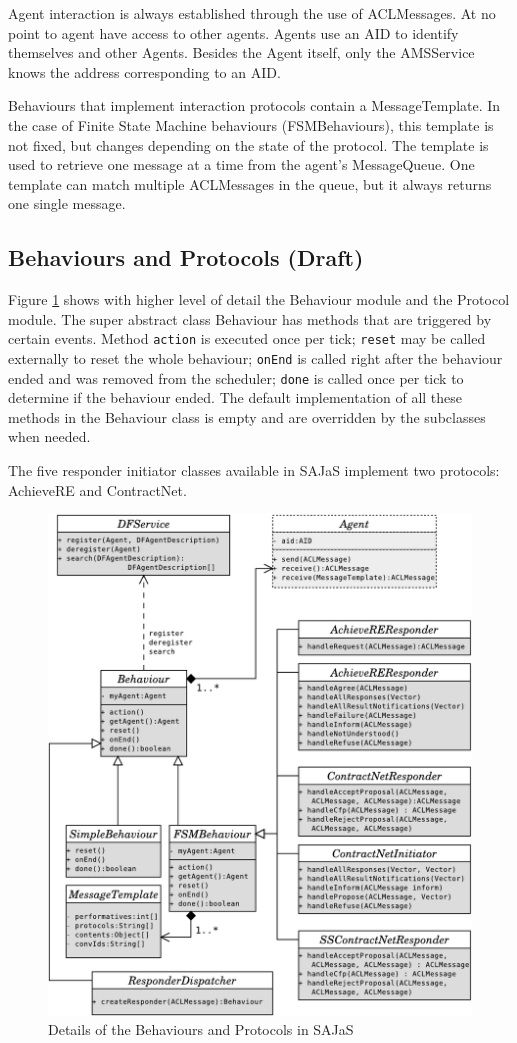 Agent interaction is always established through the use of ACLMessages. At no point to agent have access to other agents. Agents use an AID to identify themselves and other Agents. Besides the Agent itself, only the AMSService knows the address corresponding to an AID.

Behaviours that implement interaction protocols contain a MessageTemplate. In the case of Finite State Machine behaviours (FSMBehaviours), this template is not fixed, but changes depending on the state of the protocol. The template is used to retrieve one message at a time from the agent's MessageQueue. One template can match multiple ACLMessages in the queue, but it always returns one single message.

\subsection{Behaviours and Protocols (Draft)}
\label{sec:arch_behaviours}
Figure \ref{fig:arch_proto} shows with higher level of detail the Behaviour module and the Protocol module. The super abstract class Behaviour has methods that are triggered by certain events. Method \texttt{action} is executed once per tick; \texttt{reset} may be called externally to reset the whole behaviour; \texttt{onEnd} is called right after the behaviour ended and was removed from the scheduler; \texttt{done} is called once per tick to determine if the behaviour ended. The default implementation of all these methods in the Behaviour class is empty and are overridden by the subclasses when needed.

The five responder initiator classes available in SAJaS implement two protocols: AchieveRE and ContractNet.

\begin{figure}
	\centering
	\includegraphics[width=0.7\linewidth]{figures/sajas_arch_proto.pdf}
	\caption[Behaviours and protocols in SAJaS]
	{Details of the Behaviours and Protocols in SAJaS}
	\label{fig:arch_proto}
\end{figure}

